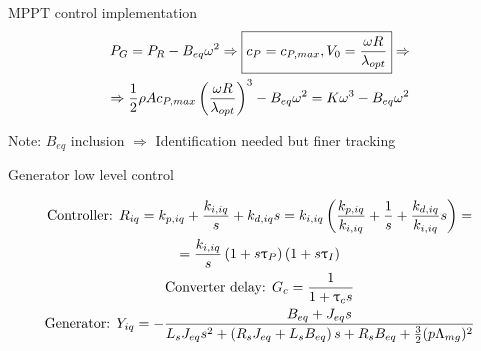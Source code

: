 \begin{frame}{MPPT control implementation}
  \begin{gather}
    P_G = P_R - B_{eq} \omega^2 \Rightarrow \boxed{c_P = c_{P,max}, V_0=\frac{\omega R}{\lambda_{opt}}} \Rightarrow \notag\\
    \Rightarrow \frac{1}{2}\rho A c_{P,max} \left(\frac{\omega R}{\lambda_{opt}}\right)^3 - B_{eq} \omega^2=K\omega^3 - B_{eq} \omega^2
    \notag
  \end{gather}

  \begin{figure}
      \centering
      \begingroup
        
      \endgroup
  \end{figure}
  Note: $B_{eq}$ inclusion $\Rightarrow$ Identification needed but finer tracking
\end{frame}

\begin{frame}{Generator low level control}
  \begin{figure}[H]
    \centering
    \begingroup
      
    \endgroup
  \end{figure}

  \begin{gather}
    \text{Controller: } R_{iq}=k_{p,iq} + \frac{k_{i,iq}}{s}+k_{d,iq}s=k_{i,iq}\left( \frac{k_{p,iq}}{k_{i,iq}} + \frac{1}{s} + \frac{k_{d,iq}}{k_{i,iq}}s \right) = \notag\\
    =\frac{k_{i,iq}}{s}\left(1+s\uptau_P\right)\left(1+s\uptau_I\right) \notag\\
    \text{Converter delay: } G_c = \frac{1}{1+\uptau_cs} \notag\\
    \text{Generator: } Y_{iq} = -\frac{B_{eq} + J_{eq}s}{L_sJ_{eq}s^2+\left(R_sJ_{eq} + L_s B_{eq}\right)s + R_sB_{eq} + \frac{3}{2}(p\Lambda_{mg})^2} \notag        
  \end{gather}
\end{frame}